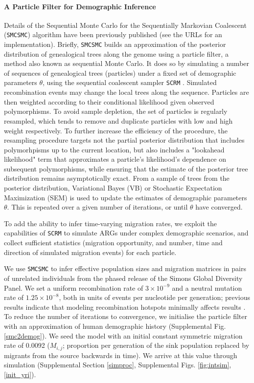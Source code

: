 \paragraph{A Particle Filter for Demographic Inference} Details of the Sequential Monte Carlo for the Sequentially Markovian Coalescent ({\tt SMCSMC}) algorithm have been previously published \cite{Henderson2018} (see the URLs for an implementation). Briefly, {\tt SMCSMC} builds an approximation of the posterior distribution of genealogical trees along the genome using a particle filter, a method also known as sequential Monte Carlo. It does so by simulating a number of sequences of genealogical trees (particles) under a fixed set of demographic parameters $\theta$, using the sequential coalescent sampler {\tt SCRM} \cite{Staab2015}. Simulated recombination events may change the local trees along the sequence. Particles are then weighted according to their conditional likelihood given observed polymorphisms.  To avoid sample depletion, the set of particles is regularly resampled, which tends to remove and duplicate particles with low and high weight respectively.  To further increase the efficiency of the procedure, the resampling procedure targets not the partial posterior distribution that includes polymorhpisms up to the current location, but also includes a "lookahead likelihood" term that approximates a particle's likelihood's dependence on subsequent polymorphisms, while ensuring that the estimate of the posterior tree distribution remains asymptotically exact.  From a sample of trees from the posterior distribution, Variational Bayes (VB) or Stochastic Expectation Maximization (SEM) is used to update the estimates of demographic parameters $\theta$. This is repeated over a given number of iterations, or until $\theta$ have converged.

To add the ability to infer time-varying migration rates, we exploit the capabilities of {\tt SCRM} to simulate ARGs under complex demographic scenarios, and collect sufficient statistics (migration opportunity, and number, time and direction of simulated migration events) for each particle.

We use {\tt SMCSMC} to infer effective population sizes and migration matrices in pairs of unrelated individuals from the phased release of the Simons Global Diversity Panel. We set a uniform recombination rate of $3\times10^{-9}$ and a neutral mutation rate of $1.25\times10^{-8}$, both in units of events per nucleotide per generation; previous results indicate that modeling recombination
hotspots minimally affects results \cite{Li2011}. To reduce the number of iterations to convergence, we initialise the particle filter with an approximation of human demographic history (Supplemental Fig. \ref{smc2demog}).
We seed the model with an initial constant symmetric  migration rate of 0.0092 ($M_{i,j}$; proportion per generation of the sink population replaced by migrants from the source backwards in time). We arrive at this value through simulation (Supplemental Section \ref{simproc}, Supplemental Figs. \ref{fig:intsim}, \ref{init_yri}).

